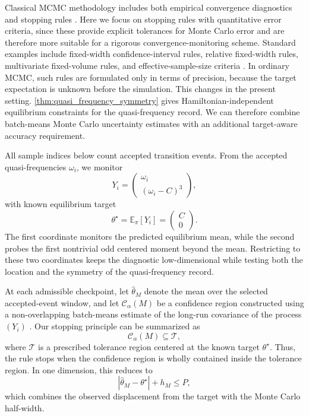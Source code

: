 \documentclass[showpacs,amsmath,amssymb,twocolumn,prx,superscriptaddress,10pt,aps,nofootinbib]{revtex4-2}
\begin{document}
Classical MCMC methodology includes both empirical convergence diagnostics and stopping rules \cite{Vivekananda2019}. Here we focus on stopping rules with quantitative error criteria, since these provide explicit tolerances for Monte Carlo error and are therefore more suitable for a rigorous convergence-monitoring scheme. Standard examples include fixed-width confidence-interval rules, relative fixed-width rules, multivariate fixed-volume rules, and effective-sample-size criteria \cite{jones2006fixed,flegal2008markov,flegal2010batch,vats2019multivariate}. In ordinary MCMC, such rules are formulated only in terms of precision, because the target expectation is unknown before the simulation. This changes in the present setting. \autoref{thm:quasi_frequency_symmetry} gives Hamiltonian-independent equilibrium constraints for the quasi-frequency record. We can therefore combine batch-means Monte Carlo uncertainty estimates with an additional target-aware accuracy requirement.


All sample indices below count accepted transition events. From the accepted
quasi-frequencies $\omega_i$, we monitor
\begin{equation}
\label{eq:main_monitored_observable}
    Y_i
    =
    \begin{pmatrix}
        \omega_i\\
        (\omega_i-C)^3
    \end{pmatrix},
\end{equation}
with known equilibrium target
\begin{equation}
    \theta^\star
    =
    \mathbb E_\pi[Y_i]
    =
    \begin{pmatrix}
        C\\
        0
    \end{pmatrix}.
\end{equation}
The first coordinate monitors the predicted equilibrium mean, while the second probes the first nontrivial odd centered moment beyond the mean. Restricting to these two coordinates keeps the diagnostic low-dimensional while testing both the location and the symmetry of the quasi-frequency record.

At each admissible checkpoint, let $\widehat\theta_M$ denote the mean over the selected accepted-event window, and let $\mathcal C_\alpha(M)$ be a confidence region constructed
using a non-overlapping batch-means estimate of the long-run covariance of the process
$(Y_i)$ \cite{vats2019multivariate}. Our stopping principle can be summarized as
\begin{equation}
\label{eq:main_unified_inclusion_principle}
\mathcal C_\alpha(M)\subseteq\mathcal T,
\end{equation}
where $\mathcal T$ is a prescribed tolerance region centered at the known target
$\theta^\star$. Thus, the rule stops when the confidence region is wholly contained inside the tolerance region. In one dimension, this reduces to
\begin{equation}
\label{eq:main_scalar_inclusion_prototype}
    |\widehat\theta_M-\theta^\star|+h_M\le P,
\end{equation}
which combines the observed displacement from the target with the Monte Carlo half-width.
\end{document}
